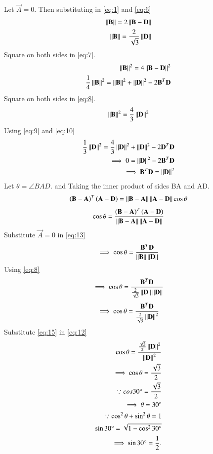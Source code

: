 \documentclass[journal,12pt,twocolumn]{IEEEtran}
\begin{document}
Let $\vec{A}=0$. Then substituting in \eqref{eq:1} and \eqref{eq:6}
\begin{align}
    \label{eq:7}\left\lVert\mathbf{B}\right\rVert=2\left\lVert\mathbf{B-D}\right\rVert\\
    \label{eq:8}\left\lVert\mathbf{B}\right\rVert=\frac{2}{\sqrt{3}}\left\lVert\mathbf{D}\right\rVert
\end{align}
Square on both sides in \eqref{eq:7}.
\begin{align}
    \left\lVert\mathbf{B}\right\rVert^2=4\left\lVert\mathbf{B-D}\right\rVert^2\\
    \frac{1}{4}\left\lVert\mathbf{B}\right\rVert^2=\left\lVert\mathbf{B}\right\rVert^2+\left\lVert\mathbf{D}\right\rVert^2-2\mathbf{B}^T\mathbf{D}\label{eq:9}
\end{align}
Square on both sides in \eqref{eq:8}.
\begin{align}
\left\lVert\mathbf{B}\right\rVert^2 = \frac{4}{3}\left\lVert\mathbf{D}\right\rVert^2\label{eq:10}
\end{align}
Using \eqref{eq:9} and \eqref{eq:10}
\begin{align}
    \frac{1}{3}\left\lVert\mathbf{D}\right\rVert^2=\frac{4}{3}\left\lVert\mathbf{D}\right\rVert^2+\left\lVert\mathbf{D}\right\rVert^2-2\mathbf{D}^T\mathbf{D}\\
    \implies0=\left\lVert\mathbf{D}\right\rVert^2-2\mathbf{B}^T\mathbf{D}\\
     \implies\mathbf{B}^T\mathbf{D}=\left\lVert\mathbf{D}\right\rVert^2\label{eq:15}
\end{align}
Let $\theta=\angle BAD$. and Taking the inner product of sides BA and AD.
\begin{align}
    \left(\mathbf{B}-\mathbf{A}\right)^T\left(\mathbf{A}-\mathbf{D}\right) =
    \left\lVert\mathbf{B}-\mathbf{A}\right\rVert\left\lVert\mathbf{A}-\mathbf{D}\right\rVert\cos{\theta}
\end{align}
\begin{align}
    \cos{\theta}=\frac{\left(\mathbf{B}-\mathbf{A}\right)^T\left(\mathbf{A}-\mathbf{D}\right)}{\left\lVert\mathbf{B}-\mathbf{A}\right\rVert\left\lVert\mathbf{A}-\mathbf{D}\right\rVert}\label{eq:13}
\end{align}
Substitute $\vec{A}=0$ in \eqref{eq:13}
\begin{align}
    \label{eq:12}\implies\cos{\theta}=\frac{\mathbf{B}^T\mathbf{D}}{\left\lVert\mathbf{B}\right\rVert\left\lVert\mathbf{D}\right\rVert}
\end{align}
Using \eqref{eq:8} 
\begin{align}
     \label{eq:12}\implies\cos{\theta}=\frac{\mathbf{B}^T\mathbf{D}}{\frac{2}{\sqrt{3}}\left\lVert\mathbf{D}\right\rVert\left\lVert\mathbf{D}\right\rVert}
\end{align}
\begin{align}
\label{eq:12}\implies\cos{\theta}=\frac{\mathbf{B}^T\mathbf{D}}{\frac{2}{\sqrt{3}}\left\lVert\mathbf{D}\right\rVert^2}
\end{align}
Substitute \eqref{eq:15} in \eqref{eq:12}
\begin{align}
\cos\theta = \frac{{\frac{\sqrt{3}}{2}\left\lVert\mathbf{D}\right\rVert^2}}{\left\lVert\mathbf{D}\right\rVert^2}\\
    \implies\cos\theta=\frac{\sqrt{3}}{2}\\
    \because cos30\degree = \frac{\sqrt{3}}{2}\\
    \implies\theta = 30\degree\\
    \because \cos^2\theta +\sin^2\theta = 1\\
     \sin30\degree = \sqrt{1-\cos^230\degree}\\
    \implies\sin30\degree = \frac{1}{2}.
\end{align} 
\end{document}
